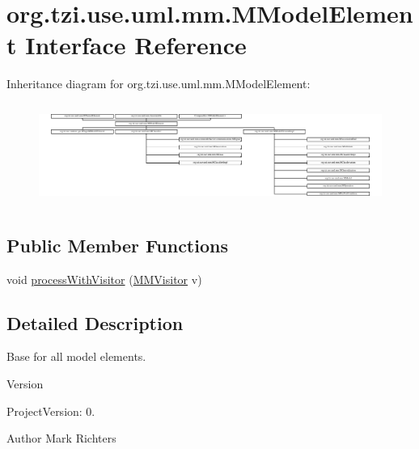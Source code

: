 \hypertarget{interfaceorg_1_1tzi_1_1use_1_1uml_1_1mm_1_1_m_model_element}{\section{org.\-tzi.\-use.\-uml.\-mm.\-M\-Model\-Element Interface Reference}
\label{interfaceorg_1_1tzi_1_1use_1_1uml_1_1mm_1_1_m_model_element}
}
Inheritance diagram for org.\-tzi.\-use.\-uml.\-mm.\-M\-Model\-Element\-:\begin{figure}[H]
\begin{center}
\leavevmode
\includegraphics[height=3.356948cm]{interfaceorg_1_1tzi_1_1use_1_1uml_1_1mm_1_1_m_model_element}
\end{center}
\end{figure}
\subsection*{Public Member Functions}
\begin{DoxyCompactItemize}
\item 
void \hyperlink{interfaceorg_1_1tzi_1_1use_1_1uml_1_1mm_1_1_m_model_element_a2ba6a0dfc8f296de43eaef406e3ee5d2}{process\-With\-Visitor} (\hyperlink{interfaceorg_1_1tzi_1_1use_1_1uml_1_1mm_1_1_m_m_visitor}{M\-M\-Visitor} v)
\end{DoxyCompactItemize}


\subsection{Detailed Description}
Base for all model elements.

\begin{DoxyVersion}{Version}

\end{DoxyVersion}
\begin{DoxyParagraph}{Project\-Version\-:}
0. 
\end{DoxyParagraph}
\begin{DoxyAuthor}{Author}
Mark Richters 
\end{DoxyAuthor}


